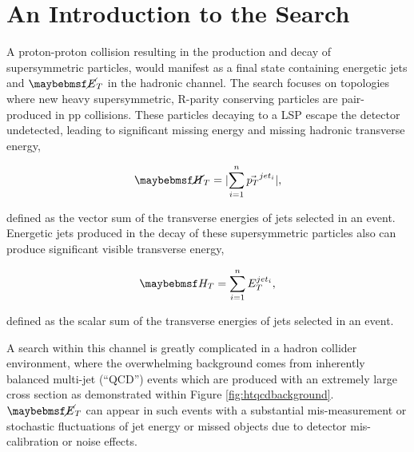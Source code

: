 \section{An Introduction to the \alphat Search}
\label{sec:alphatintroduction}

A proton-proton collision resulting in the production and decay of supersymmetric particles,  would manifest as a final state containing energetic jets and $\met$ in the hadronic channel. The search focuses on topologies where new heavy supersymmetric, R-parity conserving particles are pair-produced in pp collisions. These particles decaying to a \ac{LSP} escape the detector undetected, leading to significant missing energy and missing hadronic transverse energy,

\begin{equation}
\mht =  \lvert \sum_{i=1}^{n} \vec{p_{T}}^{jet_{i}} \rvert,
\end{equation}

defined as the vector sum of the transverse energies of jets selected in an event. Energetic jets produced in the decay of these supersymmetric particles also 
can produce significant visible transverse energy, 

\begin{equation}
\theht = \sum_{i=1}^{n} E_{T}^{jet_{i}},
\end{equation}

defined as the scalar sum of the transverse energies of jets selected in an event.

A search within this channel is greatly complicated in a hadron collider environment, where the overwhelming background comes from inherently balanced multi-jet (``QCD'') events which are produced with an extremely large cross section as demonstrated within Figure \ref{fig:htqcdbackground}. $\met$ can appear in such events with a substantial mis-measurement or stochastic fluctuations of jet energy or missed objects due to detector mis-calibration or noise effects. 

